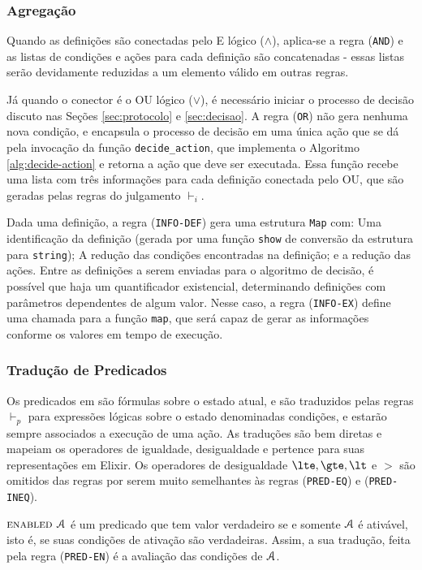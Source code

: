 \subsubsection{Agregação}


Quando as definições são conectadas pelo E lógico ($\land$), aplica-se a regra
(\texttt{AND}) e as listas de
condições e ações para cada definição são concatenadas - essas listas serão
devidamente reduzidas a um elemento válido em outras regras.

Já quando o conector é o OU lógico ($\lor$), é necessário iniciar o processo de decisão
discuto nas Seções \ref{sec:protocolo} e \ref{sec:decisao}. A regra
(\texttt{OR}) não gera nenhuma nova condição, e encapsula o processo de decisão
em uma única ação que se dá pela invocação da função \texttt{decide\_action},
que implementa o Algoritmo \ref{alg:decide-action} e retorna a ação que deve ser
executada. Essa função recebe uma lista com três informações para cada definição conectada
pelo OU, que são geradas pelas regras do julgamento $\vdash_i$.

Dada uma definição, a regra (\texttt{INFO-DEF}) gera uma estrutura \texttt{Map}
com: Uma identificação da definição (gerada por uma função \texttt{show} de
conversão da estrutura para \texttt{string}); A redução das condições
encontradas na definição; e a redução das ações. Entre as definições a serem
enviadas para o algoritmo de decisão, é possível que haja um quantificador
existencial, determinando definições com parâmetros dependentes
de algum valor. Nesse caso, a regra (\texttt{INFO-EX}) define uma chamada para a
função \texttt{map}, que será capaz de gerar as informações conforme os valores
em tempo de execução.


\subsubsection{Tradução de Predicados}

Os predicados em \TLA são fórmulas sobre o estado atual, e são traduzidos pelas
regras $\vdash_p$ para expressões lógicas sobre o estado denominadas condições, e estarão sempre
associados a execução de uma ação. As traduções são bem diretas e mapeiam os
operadores de igualdade, desigualdade e pertence para suas representações em
Elixir. Os operadores de desigualdade $\lte, \gte, \lt$ e $\gt$ são omitidos das
regras por serem muito semelhantes às regras (\texttt{PRED-EQ}) e
(\texttt{PRED-INEQ}).

$\textsc{enabled } \textbf{$\mathcal{A}$}$ é um predicado que tem valor verdadeiro se e somente
$\textbf{$\mathcal{A}$}$ é ativável, isto é, se suas condições de ativação são verdadeiras.
Assim, a sua tradução, feita pela regra (\texttt{PRED-EN}) é a avaliação das condições de $\textbf{$\mathcal{A}$}$.

